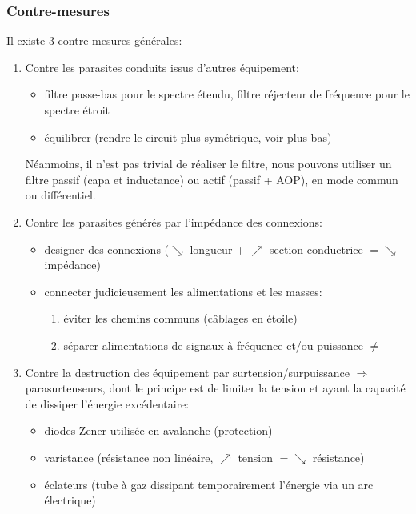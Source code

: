 \subsubsection{Contre-mesures}
Il existe 3 contre-mesures générales:
\begin{enumerate}
	\item Contre les parasites conduits issus d'autres équipement:
	\begin{itemize}
		\item filtre passe-bas pour le spectre étendu, filtre réjecteur de fréquence pour le spectre étroit
		\item équilibrer (rendre le circuit plus symétrique, voir plus bas)
	\end{itemize}
 \hspace*{\dimexpr\linewidth-\textwidth\relax}%
 \begin{minipage}[t]{\textwidth}%
 	Néanmoins, il n'est pas trivial de réaliser le filtre, nous pouvons utiliser un filtre passif (capa et inductance) ou actif (passif + AOP), en mode commun ou différentiel.
 \end{minipage} 
	\item Contre les parasites générés par l'impédance des connexions:
	\begin{itemize}
		\item designer des connexions (\(\searrow\) longueur + \(\nearrow\) section conductrice \(= \searrow\) impédance)
		\item connecter judicieusement les alimentations et les masses:
		\begin{enumerate}
			\item éviter les chemins communs (câblages en étoile)
			\item séparer alimentations de signaux à fréquence et/ou puissance \(\neq\)
		\end{enumerate}	
	\end{itemize}
	\item Contre la destruction des équipement par surtension/surpuissance \(\Rightarrow\) parasurtenseurs, dont le principe est de limiter la tension  et ayant la capacité de dissiper l'énergie excédentaire:
	\begin{itemize}
		\item diodes Zener utilisée en avalanche (protection)
		\item varistance (résistance non linéaire, \(\nearrow\) tension \(= \searrow\) résistance)
		\item éclateurs (tube à gaz dissipant temporairement l'énergie via un arc électrique)
	\end{itemize}
\end{enumerate}
